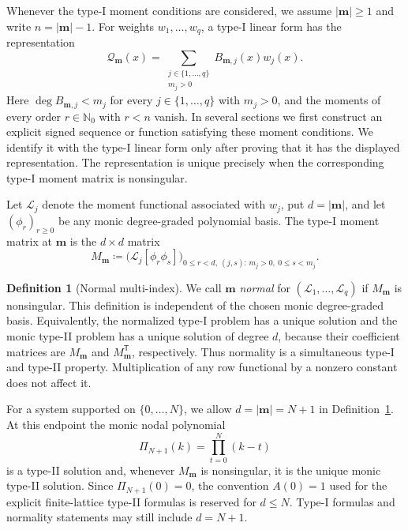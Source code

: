 \documentclass[10pt]{amsart}
\newcommand{\Nzero}{\mathbb N_0}
\newcommand{\mm}{\boldsymbol m}
\newcommand{\abs}[1]{\lvert#1\rvert}
\theoremstyle{plain}
\theoremstyle{definition}
\newtheorem{definition}[theorem]{Definition}
\theoremstyle{remark}
\begin{document}
Whenever the type-I moment conditions are considered, we assume
\(\abs\mm\ge1\) and write \(n=\abs\mm-1\). For weights
\(w_1,\ldots,w_q\), a type-I linear form has the representation
\[
 \mathcal Q_{\mm}(x)=
 \sum_{\substack{j\in\{1,\ldots,q\}\\m_j>0}}
 B_{\mm,j}(x)w_j(x).
\]
Here \(\deg B_{\mm,j}<m_j\) for every
\(j\in\{1,\ldots,q\}\) with \(m_j>0\), and the moments of every order
\(r\in\Nzero\) with \(r<n\) vanish. In several sections we
first construct an explicit signed sequence or function satisfying these
moment conditions. We identify it with the type-I linear form only after
proving that it has the displayed representation. The representation is
unique precisely when the corresponding type-I moment matrix is
nonsingular.

Let \(\mathcal L_j\) denote the moment functional associated with
\(w_j\), put \(d=\abs\mm\), and let
\((\phi_r)_{r\ge0}\) be any monic degree-graded polynomial basis. The
type-I moment matrix at \(\mm\) is the \(d\times d\) matrix
\begin{equation}
 M_{\mm}\coloneq
 \bigl(\mathcal L_j[\phi_r\phi_s]\bigr)_{
  0\le r<d,\ (j,s):\,m_j>0,\ 0\le s<m_j}.
 \label{eq:type-I-moment-matrix-definition}
\end{equation}

\begin{definition}[Normal multi-index]
\label{def:normal-multi-index}
We call \(\mm\) \emph{normal} for
\((\mathcal L_1,\ldots,\mathcal L_q)\) if \(M_{\mm}\) is nonsingular.
This definition is independent of the chosen monic degree-graded basis.
Equivalently, the normalized type-I problem has a unique solution and the
monic type-II problem has a unique solution of degree \(d\), because their
coefficient matrices are \(M_{\mm}\) and \(M_{\mm}^{\mathsf T}\),
respectively. Thus normality is a simultaneous type-I and type-II
property. Multiplication of any row functional by a nonzero constant does
not affect it.
\end{definition}

For a system supported on \(\{0,\ldots,N\}\), we allow
\(d=\abs\mm=N+1\) in Definition~\ref{def:normal-multi-index}. At this
endpoint the monic nodal polynomial
\begin{equation}
 \Pi_{N+1}(k)=\prod_{t=0}^{N}(k-t)
 \label{eq:finite-lattice-nodal-polynomial}
\end{equation}
is a type-II solution and, whenever \(M_{\mm}\) is nonsingular, it is the
unique monic type-II solution. Since \(\Pi_{N+1}(0)=0\), the convention
\(A(0)=1\) used for the explicit finite-lattice type-II formulas is
reserved for \(d\le N\). Type-I formulas and normality statements may
still include \(d=N+1\).
\end{document}
